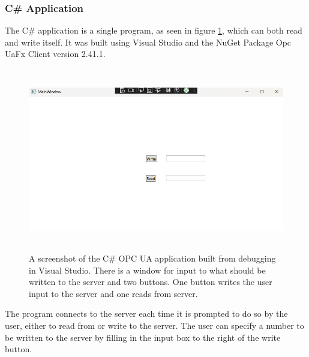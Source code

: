 \documentclass[11pt, A4paper, english]{article}
\begin{document}
			\subsubsection{C\# Application}
The C\# application is a single program, as seen in figure \ref{im:C}, which can both read and write itself. It was built using Visual Studio and the NuGet Package Opc UaFx Client version 2.41.1.
				\begin{figure}
\includegraphics[width=12.8cm, height=8cm]{Csharp OPC UA Client/Program_Screenshot.png}
\caption{A screenshot of the C\# OPC UA application built from debugging in Visual Studio. There is a window for input to what should be written to the server and two buttons. One button writes the user input to the server and one reads from server.}
\label{im:C}
				\end{figure}
The program connects to the server each time it is prompted to do so by the user, either to read from or write to the server. The user can specify a number to be written to the server by filling in the input box to the right of the write button.
\end{document}
